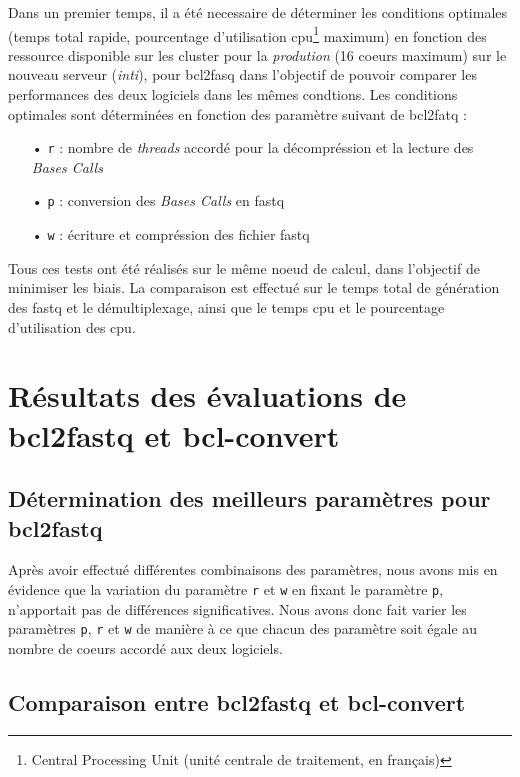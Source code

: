 Dans un premier temps, il a été necessaire de déterminer les conditions optimales (temps total rapide, pourcentage d'utilisation cpu\footnote{Central Processing Unit (unité centrale de traitement, en français)} maximum) en fonction des ressource disponible sur les cluster pour la \emph{prodution} (16 coeurs maximum) sur le nouveau serveur (\emph{inti}), pour bcl2fasq dans l'objectif de pouvoir comparer les performances des deux logiciels dans les mêmes condtions. Les conditions optimales sont déterminées en fonction des paramètre suivant de bcl2fatq : 
\begin{itemize}
    \item[•] \texttt{r} : nombre de \emph{threads} accordé pour la décompréssion et la lecture des \emph{Bases Calls}
    \item[•] \texttt{p} : conversion des \emph{Bases Calls} en fastq
    \item[•] \texttt{w} : écriture et compréssion des fichier fastq
\end{itemize}

Tous ces tests ont été  réalisés sur le même noeud de calcul, dans l'objectif de minimiser les biais. La comparaison est effectué sur le temps total de génération des fastq et le démultiplexage, ainsi que le temps cpu et le pourcentage d'utilisation des cpu.

\section{Résultats des évaluations de bcl2fastq et bcl-convert}

\subsection{Détermination des meilleurs paramètres pour bcl2fastq}
Après avoir effectué différentes combinaisons des paramètres, nous avons mis en évidence que la variation du paramètre \texttt{r} et \texttt{w} en fixant le paramètre \texttt{p}, n'apportait pas de différences significatives. Nous avons donc fait varier les paramètres \texttt{p}, \texttt{r} et \texttt{w} de manière à ce que chacun des paramètre soit égale au nombre de coeurs accordé aux deux logiciels.

\subsection{Comparaison entre bcl2fastq et bcl-convert}

